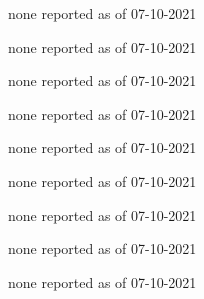 
\begin{DoxyRefList}
\item[\label{bug__bug000001}%
\Hypertarget{bug__bug000001}%
File \hyperlink{advpathfinder_8h}{advpathfinder.h} ]none reported as of 07-\/10-\/2021  
\item[\label{bug__bug000002}%
\Hypertarget{bug__bug000002}%
File \hyperlink{advpilot_8h}{advpilot.h} ]none reported as of 07-\/10-\/2021  
\item[\label{bug__bug000003}%
\Hypertarget{bug__bug000003}%
File \hyperlink{bscpathfinder_8h}{bscpathfinder.h} ]none reported as of 07-\/10-\/2021  
\item[\label{bug__bug000004}%
\Hypertarget{bug__bug000004}%
File \hyperlink{bscpilot_8h}{bscpilot.h} ]none reported as of 07-\/10-\/2021  
\item[\label{bug__bug000005}%
\Hypertarget{bug__bug000005}%
File \hyperlink{pathfinderbase_8h}{pathfinderbase.h} ]none reported as of 07-\/10-\/2021  
\item[\label{bug__bug000006}%
\Hypertarget{bug__bug000006}%
File \hyperlink{pathfinderinterface_8h}{pathfinderinterface.h} ]none reported as of 07-\/10-\/2021  
\item[\label{bug__bug000007}%
\Hypertarget{bug__bug000007}%
File \hyperlink{pilotbase_8h}{pilotbase.h} ]none reported as of 07-\/10-\/2021  
\item[\label{bug__bug000008}%
\Hypertarget{bug__bug000008}%
File \hyperlink{pilotinterface_8h}{pilotinterface.h} ]none reported as of 07-\/10-\/2021  
\item[\label{bug__bug000009}%
\Hypertarget{bug__bug000009}%
File \hyperlink{tf2_8h}{tf2.h} ]none reported as of 07-\/10-\/2021 
\end{DoxyRefList}